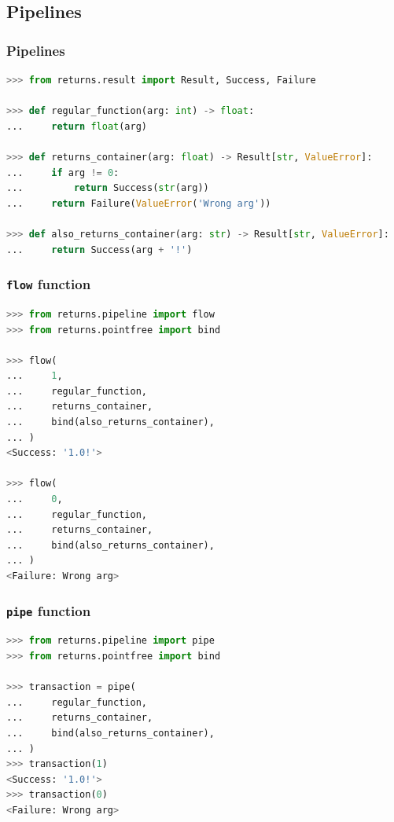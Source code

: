 \documentclass[envcountsect,10pt]{beamer}
\begin{document}
\subsection{Pipelines}

\begin{frame}[fragile]
    \frametitle{Pipelines}

    \begin{lstlisting}[language=Python]
>>> from returns.result import Result, Success, Failure

>>> def regular_function(arg: int) -> float:
...     return float(arg)

>>> def returns_container(arg: float) -> Result[str, ValueError]:
...     if arg != 0:
...         return Success(str(arg))
...     return Failure(ValueError('Wrong arg'))

>>> def also_returns_container(arg: str) -> Result[str, ValueError]:
...     return Success(arg + '!')
    \end{lstlisting}
\end{frame}

\begin{frame}[fragile]
    \frametitle{\texttt{flow} function}

    \begin{lstlisting}[language=Python]
>>> from returns.pipeline import flow
>>> from returns.pointfree import bind

>>> flow(
...     1,
...     regular_function,
...     returns_container,
...     bind(also_returns_container),
... )
<Success: '1.0!'>

>>> flow(
...     0,
...     regular_function,
...     returns_container,
...     bind(also_returns_container),
... )
<Failure: Wrong arg>
    \end{lstlisting}
\end{frame}

\begin{frame}[fragile]
    \frametitle{\texttt{pipe} function}

    \begin{lstlisting}[language=Python]
>>> from returns.pipeline import pipe
>>> from returns.pointfree import bind

>>> transaction = pipe(
...     regular_function,
...     returns_container,
...     bind(also_returns_container),
... )
>>> transaction(1)
<Success: '1.0!'>
>>> transaction(0)
<Failure: Wrong arg>
    \end{lstlisting}
\end{frame}
\end{document}
